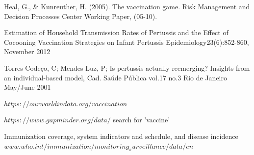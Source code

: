 \documentclass[11pt]{article}
\begin{document}
Heal, G., \& Kunreuther, H. (2005). The vaccination game. Risk Management and Decision Processes Center Working Paper, (05-10). 
\vspace{14px}

Estimation of Household Transmission Rates of Pertussis and the Effect of Cocooning Vaccination Strategies on Infant Pertussis Epidemiology23(6):852-860, November 2012

Torres Codeço, C; Mendes Luz, P; Is pertussis actually reemerging? Insights from an individual-based model, Cad. Saúde Pública vol.17 no.3 Rio de Janeiro May/June 2001
\vspace{14px}

$https://ourworldindata.org/vaccination$ 
\vspace{14px}

$https://www.gapminder.org/data/$ search for 'vaccine'
\vspace{14px}

Immunization coverage, system indicators and schedule, and disease incidence $www.who.int/immunization/monitoring_surveillance/data/en$


\newpage
\end{document}
